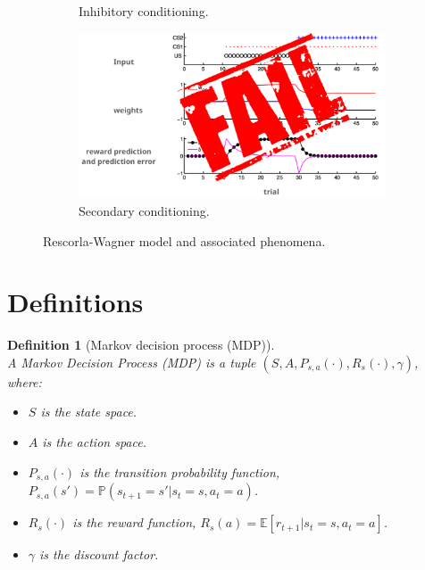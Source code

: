\documentclass[11pt]{book} %
\newtheorem{definition}{Definition}[section]
\begin{document}
\begin{figure}[ht]
\begin{subfigure}[b]{0.5\textwidth}
        \caption{Inhibitory conditioning.}
        \label{fig:blocking}
    \end{subfigure}
    \begin{subfigure}[b]{0.5\textwidth}
        \centering
        \includegraphics[width=\textwidth]{./Figs/secondary_exp.jpeg}
        \caption{Secondary conditioning.}
        \label{fig:blocking}
    \end{subfigure}
    \label{fig:rescorla_wagner}
    \caption{Rescorla-Wagner model and associated phenomena.}
\end{figure}

%
%
%
%
%


\section{Definitions}

\begin{definition}[Markov decision process (MDP)]\ \\
    A Markov Decision Process (MDP) is a tuple $(S, A, P_{s,a}(\cdot) , R_s(\cdot), \gamma)$, where:
    \begin{itemize}
        \item $S$ is the state space.
        \item $A$ is the action space.
        \item $P_{s,a}(\cdot)$ is the transition probability function, $P_{s,a}(s') = \mathbb{P}(s_{t+1} = s' | s_t = s, a_t = a)$.
        \item $R_s(\cdot)$ is the reward function, $R_s(a) = \mathbb{E}[r_{t+1} | s_t = s, a_t = a]$.
        \item $\gamma$ is the discount factor.
    \end{itemize}    
    
\end{definition}
\end{document}
